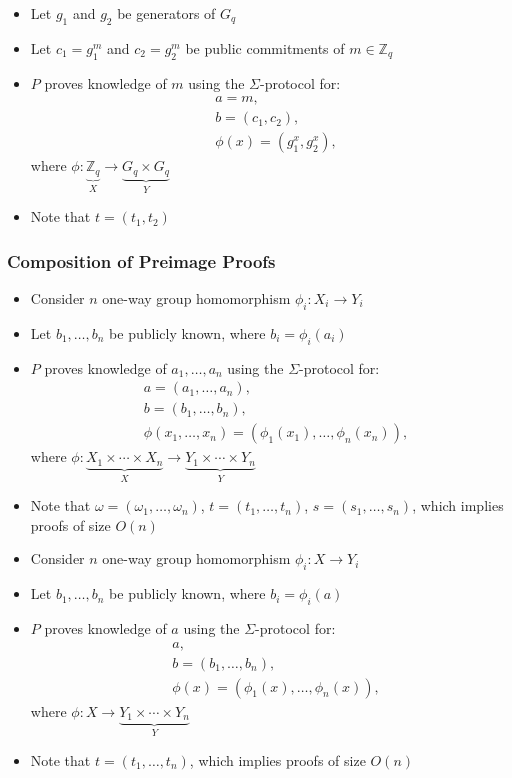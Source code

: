 \documentclass[bibtotoc,halfparskip,oneside]{scrreprt}
\begin{document}
	\begin{itemize}
		\item Let $g_1$ and $g_2$ be generators of $G_q$
		\item Let $c_1=g_1^{m}$ and $c_2=g_2^{m}$ be public commitments of $m\in\mathbb{Z}_q$ 
		\item $P$ proves knowledge of $m$ using the $\Sigma$-protocol for:
		\begin{align*}
			 &a=m,\\
			 &b=(c_1,c_2),\\
			 &\phi(x)=(g_1^{x},g_2^{x}),
		\end{align*}
		where $\phi:\underbrace{\mathbb{Z}_q}_X\rightarrow \underbrace{G_q\times G_q}_Y$
		\item Note that $t=(t_1,t_2)$
	\end{itemize}

\subsubsection{Composition of Preimage Proofs}

	\begin{itemize}
		\item Consider $n$ one-way group homomorphism $\phi_i:X_i\rightarrow Y_i$ 
		\item Let $b_1,\ldots,b_n$ be publicly known, where $b_i=\phi_i(a_i)$
		\item $P$ proves knowledge of $a_1,\ldots,a_n$ using the $\Sigma$-protocol for:
		\begin{align*}
			&a=(a_1,\ldots,a_n),\\
			&b=(b_1,\ldots,b_n),\\
			&\phi(x_1,\ldots,x_n)=(\phi_1(x_1),\ldots,\phi_n(x_n)),
		\end{align*}
		where $\phi: \underbrace{X_1\times\cdots\times X_n}_X\rightarrow \underbrace{Y_1\times\cdots\times Y_n}_Y$
		\item Note that $\omega=(\omega_1,\ldots,\omega_n)$, $t=(t_1,\ldots,t_n)$, $s=(s_1,\ldots,s_n)$, which implies proofs of size $O(n)$
	\end{itemize}

	\begin{itemize}
		\item Consider $n$ one-way group homomorphism $\phi_i:X\rightarrow Y_i$ 
		\item Let $b_1,\ldots,b_n$ be publicly known, where $b_i=\phi_i(a)$
		\item $P$ proves knowledge of $a$ using the $\Sigma$-protocol for:
		\begin{align*}
			&a,\\
			&b=(b_1,\ldots,b_n),\\
			&\phi(x)=(\phi_1(x),\ldots,\phi_n(x)),
		\end{align*}
		where $\phi: X\rightarrow \underbrace{Y_1\times\cdots\times Y_n}_Y$
		\item Note that $t=(t_1,\ldots,t_n)$, which implies proofs of size $O(n)$
	\end{itemize}
\end{document}
